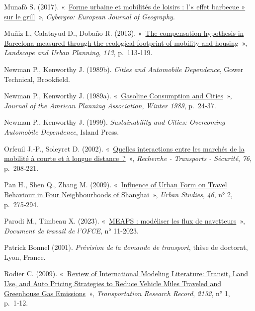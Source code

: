 \documentclass[
  9pt,
  a4paper,
  DIV=11]{scrreprt}
\newlength{\cslhangindent}
\newenvironment{CSLReferences}[2] %
 {\begin{list}{}{%
  \setlength{\itemindent}{0pt}
  \setlength{\leftmargin}{0pt}
  \setlength{\parsep}{0pt}
  \ifodd #1
   \setlength{\leftmargin}{\cslhangindent}
   \setlength{\itemindent}{-1\cslhangindent}
  \fi
  \setlength{\itemsep}{#2\baselineskip}}}
 {\end{list}}
\begin{document}
\begin{CSLReferences}{0}{1}
Munafò S. (2017). {«~\href{https://doi.org/10.4000/cybergeo.28634}{Forme
urbaine et mobilités de loisirs : l{'}« effet barbecue » sur le
grill}~»}, \emph{Cybergeo: European Journal of Geography}.

Muñiz I., Calatayud D., Dobaño R. (2013).
{«~\href{https://doi.org/10.1016/j.landurbplan.2013.02.004}{The
compensation hypothesis in Barcelona measured through the ecological
footprint of mobility and housing}~»}, \emph{Landscape and Urban
Planning}, \emph{113}, p.~113‑119.

Newman P., Kenworthy J. (1989b). \emph{Cities and Automobile
Dependence}, Gower Technical, Brookfield.

Newman P., Kenworthy J. (1989a).
{«~\href{https://doi.org/10.1080/01944368908975398}{Gasoline Consumption
and Cities}~»}, \emph{Journal of the Amrican Planning Association},
\emph{Winter 1989}, p.~24‑37.

Newman P., Kenworthy J. (1999). \emph{Sustainability and Cities:
Overcoming Automobile Dependence}, Island Press.

Orfeuil J.-P., Soleyret D. (2002).
{«~\href{https://doi.org/10.1016/S0761-8980(02)00013-4}{Quelles
interactions entre les marchés de la mobilité à courte et à longue
distance~?}~»}, \emph{Recherche - Transports - Sécurité}, \emph{76},
p.~208‑221.

Pan H., Shen Q., Zhang M. (2009).
{«~\href{https://doi.org/10.1177/0042098008099355}{Influence of Urban
Form on Travel Behaviour in Four Neighbourhoods of Shanghai}~»},
\emph{Urban Studies}, \emph{46}, n° 2, p.~275‑294.

Parodi M., Timbeau X. (2023).
{«~\href{https://preview.meaps.fr/theorie.html}{MEAPS : modéliser les
flux de navetteurs}~»}, \emph{Document de travail de l'OFCE}, n°
11-2023.

Patrick Bonnel (2001). \emph{Prévision de la demande de transport},
thèse de doctorat, Lyon, France.

Rodier C. (2009). {«~\href{https://doi.org/10.3141/2132-01}{Review of
International Modeling Literature: Transit, Land Use, and Auto Pricing
Strategies to Reduce Vehicle Miles Traveled and Greenhouse Gas
Emissions}~»}, \emph{Transportation Research Record}, \emph{2132}, n° 1,
p.~1‑12.


\end{CSLReferences}
\end{document}
